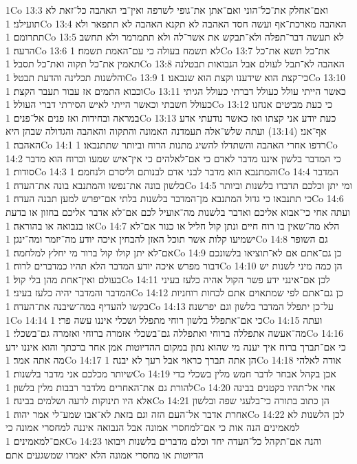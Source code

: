 1Co 13:3  ואם־אחלק את־כל־הוני ואם־אתן את־גופי לשרפה ואין־בי האהבה כל־זאת לא תועילני׃
1Co 13:4  האהבה מארכת־אף ועשה חסד האהבה לא תקנא האהבה לא תתפאר ולא תתרומם׃
1Co 13:5  לא תעשה דבר־תפלה ולא־תבקש את אשר־לה ולא תתמרמר ולא תחשב הרעה׃
1Co 13:6  לא תשמח בעולה כי עם־האמת תשמח׃
1Co 13:7  את־כל תשא את־כל תאמין את־כל תקוה ואת־כל תסבל׃
1Co 13:8  האהבה לא־תבל לעולם אבל הנבואות תבטלנה והלשנות תכלינה והדעת תבטל׃
1Co 13:9  כי־קצת הוא שידענו וקצת הוא שנבאנו׃
1Co 13:10  וכבוא התמים אז עבור תעבר הקצת׃
1Co 13:11  כאשר הייתי עולל כעולל דברתי כעולל הגיתי כעולל חשבתי וכאשר הייתי לאיש הסירתי דברי העולל׃
1Co 13:12  כי כעת מביטים אנחנו במראה ובחידות ואז פנים אל־פנים׃
1Co 13:13  כעת יודע אני קצתו ואז כאשר נודעתי אדע אף־אני׃ (13:14) ועתה שלש־אלה תעמדנה האמונה והתקוה והאהבה והגדולה שבהן היא האהבה׃
1Co 14:1  רדפו אחרי האהבה והשתדלו להשיג מתנות הרוח וביותר שתתנבאו׃
1Co 14:2  כי המדבר בלשון איננו מדבר לאדם כי אם־לאלהים כי אין־איש שמעו וברוח הוא מדבר סודות׃
1Co 14:3  והמתנבא הוא מדבר לבני אדם לבנותם וליסרם ולנחמם׃
1Co 14:4  המדבר בלשון בונה את־נפשו והמתנבא בונה את־העדה׃
1Co 14:5  ומי יתן וכלכם תדברו בלשנות וביותר כי תתנבאו כי גדול המתנבא מן־המדבר בלשנות בלתי אם־יפרש למען תבנה העדה׃
1Co 14:6  ועתה אחי כי־אבוא אליכם ואדבר בלשנות מה־אועיל לכם אם־לא אדבר אליכם בחזון או בדעת או בנבואה או בהוראה׃
1Co 14:7  הלא מה־שאין בו רוח חיים ונתן קול חליל או כנור אם־לא ישמיעו קלות אשר תוכל האזן להבחין איכה יודע מה־יזמר ומה־ינגן׃
1Co 14:8  גם השופר אם־לא יתן קולו קול ברור מי יחלץ למלחמה׃
1Co 14:9  כן גם־אתם אם לא־תוציאו בלשונכם דבור מפרש איכה יודע המדבר הלא תהיו כמדברים לרוח׃
1Co 14:10  הן כמה מיני לשנות יש בעולם ואין־אחת מהן בלי קול׃
1Co 14:11  לכן אם־אינני ידע פשר הקול אהיה כלעז בעיני המדבר והמדבר יהיה כלעז בעיני׃
1Co 14:12  כן גם־אתם לפי שמתאוים אתם לכחות רוחניות בקשו להעדיף במה־שיבנה את־העדה׃
1Co 14:13  על־כן יתפלל המדבר בלשון וגם יפרשנה׃
1Co 14:14  כי אם־אתפלל בלשון רוחי מתפלל ושכלי איננו עשה פרי׃
1Co 14:15  ועתה מה־אעשה אתפללה ברוחי ואתפללה גם־בשכלי אזמרה ברוחי ואזמרה גם־בשכלי׃
1Co 14:16  כי אם־תברך ברוח איך יענה מי שהוא נתון במקום ההדיוטות אמן אחר ברכתך והוא איננו ידע מה אתה אמר׃
1Co 14:17  הן אתה תברך כראוי אבל רעך לא יבנה׃
1Co 14:18  אודה לאלהי שיותר מכלכם אני מדבר בלשנות׃
1Co 14:19  אכן בקהל אבחר לדבר חמש מלין בשכלי כדי להורת גם את־האחרים מלדבר רבבות מלין בלשון׃
1Co 14:20  אחי אל־תהיו כקטנים בבינה אלא היו תינוקות לרעה ושלמים בבינה׃
1Co 14:21  הן כתוב בתורה כי־בלעגי שפה ובלשון אחרת אדבר אל־העם הזה וגם בזאת לא־אבו שמע־לי אמר יהוה׃
1Co 14:22  לכן הלשנות לא למאמינים הנה אות כי אם־למחסרי אמונה אבל הנבואה איננה למחסרי אמונה כי אם־למאמינים׃
1Co 14:23  והנה אם־תקהל כל־העדה יחד וכלם מדברים בלשנות ויבואו הדיוטות או מחסרי אמונה הלא יאמרו שמשגעים אתם׃
